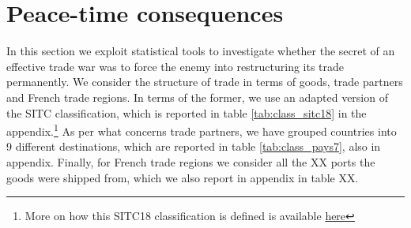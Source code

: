 \documentclass[12pt,a4paper,notitlepage,english]{article}
\begin{document}

\section{Peace-time consequences} \label{sec:empirical_analysis}

In this section we exploit statistical tools to investigate whether the secret of an effective trade war was to force the enemy into restructuring its trade permanently. 
We consider the structure of trade in terms of goods, trade partners and French trade regions. 
In terms of the former, we use an adapted version of the SITC classification, which is reported in table \ref{tab:class_sitc18} in the appendix.\footnote{More on how this SITC18 classification is defined is available \href{http://toflit18.medialab.sciences-po.fr/\#/home}{here}} As per what concerns trade partners, we have grouped countries into 9 different destinations, which are reported in table \ref{tab:class_pays7}, also in appendix. Finally, for French trade regions we consider all the XX ports the goods were shipped from, which we also report in appendix in table XX. 
\end{document}
